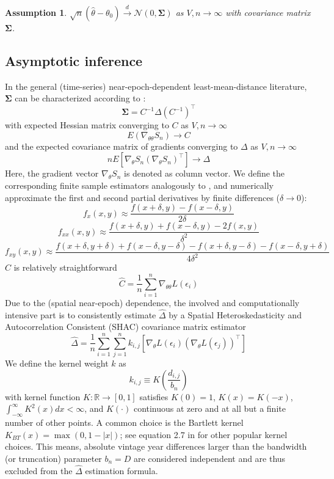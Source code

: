 \documentclass[12pt]{article}
\newtheorem{assume}{Assumption}
\begin{document}
\begin{assume}
	$\sqrt{n}(\hat{\theta} - \theta_0) \overset{d}{\to} \mathcal{N}(0,\mathbf{\Sigma})$ as $V,n \to \infty$ with covariance matrix $\mathbf{\Sigma}$.
\end{assume}

\subsection{Asymptotic inference}
\label{sec:asymptotic_inference}

In the general (time-series) near-epoch-dependent least-mean-distance literature, $\mathbf{\Sigma}$ can be characterized according to \citet[Theorem 11.2.b, Theorem H.1]{PP97}:
\[
\mathbf{\Sigma} = C^{-1} \Delta (C^{-1})^\top
\]
with expected Hessian matrix converging to $C$ as $V,n \to \infty$
\[
E 
\left(
\nabla_{\theta \theta} S_n
\right)
\to C
\]
and the expected covariance matrix of gradients converging to $\Delta$ as $V,n \to \infty$
\[
n E 
\left[
\nabla_{\theta} S_n
(\nabla_{\theta} S_n)^\top
\right]
\to \Delta
\]
Here, the gradient vector $\nabla_{\theta} S_n$ is denoted as column vector.
We define the corresponding finite sample estimators analogously to \citet[Chapters 12, 13.1]{PP97}, and numerically approximate the first and second partial derivatives by finite differences ($\delta \to 0$): 
\[
f_{x}(x,y) \approx \frac{f(x+\delta,y) - f(x-\delta,y)}{2\delta}
\]
\[
f_{xx}(x,y) \approx \frac{f(x+\delta,y) + f(x-\delta,y) - 2  f(x,y)}{\delta^2}
\]
\[
f_{xy}(x,y) \approx \frac{f(x+\delta,y+\delta) + f(x-\delta,y-\delta) -  f(x+\delta,y-\delta) - f(x-\delta,y+\delta)}{4\delta^2}
\]
$\hat{C}$ is relatively straightforward
\[
\hat{C} = \frac{1}{n} \sum_{i=1}^n \nabla_{\theta \theta} L \left( \epsilon_i \right)
\]
Due to the (spatial near-epoch) dependence, the involved and computationally intensive part is to consistently estimate $\hat{\Delta}$ by a Spatial Heteroskedasticity and Autocorrelation Consistent (SHAC) covariance matrix estimator \cite[equation 2]{KS11}
\begin{equation}
\label{eq:hac}
\hat{\Delta} = \frac{1}{n} \sum_{i=1}^n \sum_{j=1}^n
k_{i,j}
\left[
\nabla_{\theta} L \left( \epsilon_i \right)
\left(
\nabla_{\theta} L \left( \epsilon_j \right)
\right)^\top
\right]
\end{equation}
We define the kernel weight $k$ as
\[
k_{i,j} \equiv K \left( \frac{d_{i,j}}{b_n} \right)
\]
with kernel function $K: \mathbb{R} \to [0,1]$ satisfies $K(0)=1$, $K(x)=K(-x)$, $\int_{-\infty}^{\infty} K^2(x) dx < \infty$, and $K(\cdot)$ continuous at zero and at all but a finite number of other points.
A common choice is the Bartlett kernel $K_{BT}(x)= \max(0, 1-|x|)$; see equation 2.7 in \cite{A91} for other popular kernel choices.
This means, absolute vintage year differences larger than the bandwidth (or truncation) parameter $b_n=D$ are considered independent and are thus excluded from the $\hat{\Delta}$ estimation formula.
\end{document}
